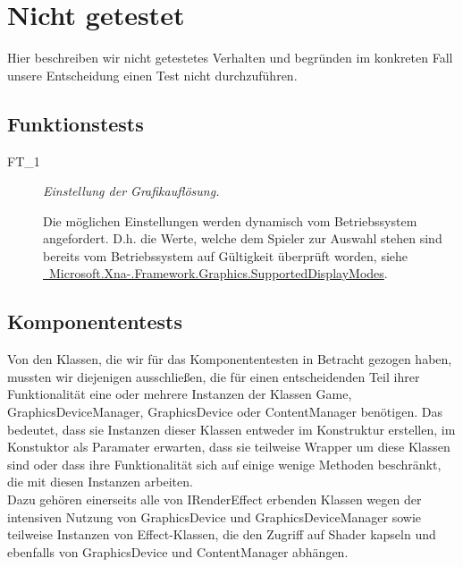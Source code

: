 %



\newpage



\section{Nicht getestet}
\label{Abschnitt:Tests:Nicht}

Hier beschreiben wir nicht getestetes Verhalten und begründen im konkreten Fall unsere Entscheidung einen Test nicht durchzuführen.
~\\




\subsection*{Funktionstests}
\label{Abschnitt:Tests:Nicht:Funktion}

\begin{description}

	\item[FT\_1] \textit{Einstellung der Grafikauflösung.} \hfill\\
	
	\label{FT:1}
	
	Die möglichen Einstellungen werden dynamisch vom Betriebssystem angefordert. D.h. die Werte, welche dem Spieler zur Auswahl stehen sind bereits vom Betriebssystem auf Gültigkeit überprüft worden, siehe  \href{http://msdn.microsoft.com/de-de/library/microsoft.xna.framework.graphics.graphicsadapter.supporteddisplaymodes}{\mousecursor~Microsoft.Xna-.Framework.Graphics.SupportedDisplayModes}.
	~\\
	
\end{description}




\subsection*{Komponententests}
\label{Abschnitt:Tests:Nicht:Komponenten}

Von den Klassen, die wir für das Komponententesten in Betracht gezogen haben, mussten wir diejenigen ausschließen, die für einen entscheidenden Teil ihrer Funktionalität eine oder mehrere Instanzen der Klassen Game, GraphicsDeviceManager, GraphicsDevice oder ContentManager benötigen. Das bedeutet, dass sie Instanzen dieser Klassen entweder im Konstruktur erstellen, im Konstuktor als Paramater erwarten, dass sie teilweise Wrapper um diese Klassen sind oder dass ihre Funktionalität sich auf einige wenige Methoden beschränkt, die mit diesen Instanzen arbeiten.
~\\
Dazu gehören einerseits alle von IRenderEffect erbenden Klassen wegen der intensiven Nutzung von GraphicsDevice und GraphicsDeviceManager sowie teilweise Instanzen von Effect-Klassen, die den Zugriff auf Shader kapseln und ebenfalls von GraphicsDevice und ContentManager abhängen.
~\\

